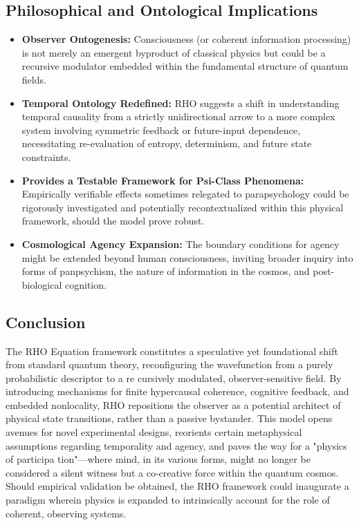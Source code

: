\documentclass{report}
\begin{document}
\subsection{Philosophical and Ontological Implications} %
\label{subsec:rho_philosophical}
\begin{itemize}
    \itemsep0em
    \item \textbf{Observer Ontogenesis:} Consciousness (or coherent information processing) is not merely an emergent byproduct of classical physics but could be a recursive modulator embedded within the fundamental structure of quantum fields.
    \item \textbf{Temporal Ontology Redefined:} RHO suggests a shift in understanding temporal causality from a strictly unidirectional arrow to a more complex system involving symmetric feedback or future-input dependence, necessitating re-evaluation of entropy, determinism, and future state constraints.
    \item \textbf{Provides a Testable Framework for Psi-Class Phenomena:} Empirically verifiable effects sometimes relegated to parapsychology could be rigorously investigated and potentially recontextualized within this physical framework, should the model prove robust.
    \item \textbf{Cosmological Agency Expansion:} The boundary conditions for agency might be extended beyond human consciousness, inviting broader inquiry into forms of panpsychism, the nature of information in the cosmos, and post-biological cognition.
\end{itemize}

\subsection{Conclusion} %
\label{subsec:rho_conclusion}
The RHO Equation framework constitutes a speculative yet foundational shift from standard
quantum theory, reconfiguring the wavefunction from a purely probabilistic descriptor to a re cursively modulated, observer-sensitive field. By introducing mechanisms for finite hypercausal
coherence, cognitive feedback, and embedded nonlocality, RHO repositions the observer as a
potential architect of physical state transitions, rather than a passive bystander.
This model opens avenues for novel experimental designs, reorients certain metaphysical
assumptions regarding temporality and agency, and paves the way for a "physics of participa tion"—where mind, in its various forms, might no longer be considered a silent witness but a
co-creative force within the quantum cosmos. Should empirical validation be obtained, the RHO
framework could inaugurate a paradigm wherein physics is expanded to intrinsically account for
the role of coherent, observing systems.
\end{document}

